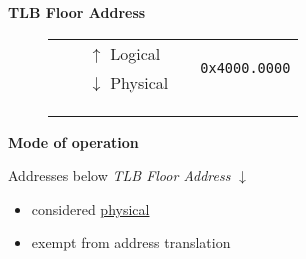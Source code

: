 \documentclass{beamer}
\begin{document}
\begin{frame}
\begin{center}
\begin{block}{\textbf{{\small TLB Floor Address}}}
\begin{minipage}{0.65\textwidth}
\begin{figure}[h]
\begin{tabular}{rrrcl}
						                                                  &                                                   & \multicolumn{1}{l|}{{\tiny $\uparrow$ Logical}}    & \multicolumn{1}{c|}{\cellcolor{nord12}\multirow{-4}{*}{}} & \multirow{2}{*}{\texttt{{\tiny 0x4000.0000}}} \\ \hhline{~~--~}
						                                                  &                                                   & \multicolumn{1}{l|}{{\tiny $\downarrow$ Physical}} & \multicolumn{1}{c|}{\cellcolor{nord11}}                   &                                               \\
						                                                  &                                                   & \multicolumn{1}{r|}{}                              & \multicolumn{1}{c|}{\cellcolor{nord11}}                   &                                               \\
						                                                  &                                                   & \multicolumn{1}{r|}{}                              & \multicolumn{1}{c|}{\cellcolor{nord11}}                   &                                               \\
						                                                  &                                                   & \multicolumn{1}{r|}{}                              & \multicolumn{1}{c|}{\multirow{-4}{*}{\cellcolor{nord11}}} &                                               \\ \cline{4-4}
					\end{tabular}
				\end{figure}
			\end{minipage}
		\end{block}
		\begin{block}{\textbf{{\small Mode of operation}}}
			\vspace{0.2em}
			\begin{minipage}{0.45\textwidth}
				\begin{scriptsize}
					Addresses below \textit{TLB Floor Address} $\downarrow$
					\begin{itemize}
						\item considered \underline{physical}
						\item exempt from address translation
					\end{itemize}
				\end{scriptsize}

\end{minipage}
\end{block}
\end{center}
\end{frame}
\end{document}
